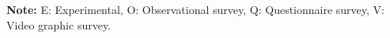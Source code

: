 \begin{table}[!ht]
{\begin{tabular}{llllll}
    \bottomrule

  
    
    \end{tabular}
    }
{\scriptsize
\begin{minipage}{0.8\textwidth}
    \begin{flushleft}
    \vspace{0.2cm}
        {\scriptsize \textbf{Note:} E: Experimental, O: Observational survey, Q: Questionnaire survey, V: Video graphic survey.}
    \end{flushleft}
\end{minipage}
}
  \label{tab: table2_1}%
\end{table}%
